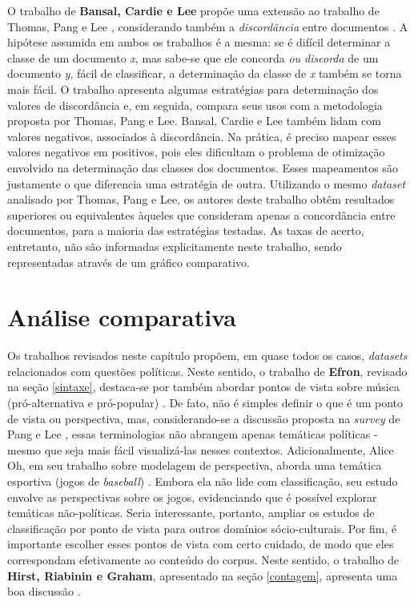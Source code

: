 O trabalho de \textbf{Bansal, Cardie e Lee} propõe uma extensão ao trabalho de Thomas, Pang e Lee \cite{get-out-the-vote}, considerando também a \emph{discordância} entre documentos \cite{disagree}. A hipótese assumida em ambos os trabalhos é a mesma: se é difícil determinar a classe de um documento \emph{x}, mas sabe-se que ele concorda \emph{ou discorda} de um documento \emph{y}, fácil de classificar, a determinação da classe de \emph{x} também se torna mais fácil. O trabalho apresenta algumas estratégias para determinação dos valores de discordância e, em seguida, compara seus usos com a metodologia proposta por Thomas, Pang e Lee. Bansal, Cardie e Lee também lidam com valores negativos, associados à discordância. Na prática, é preciso mapear esses valores negativos em positivos, pois eles dificultam o problema de otimização envolvido na determinação das classes dos documentos. Esses mapeamentos são justamente o que diferencia uma estratégia de outra. Utilizando o mesmo \emph{dataset} analisado por Thomas, Pang e Lee, os autores deste trabalho obtêm resultados superiores ou equivalentes àqueles que consideram apenas a concordância entre documentos, para a maioria das estratégias testadas. As taxas de acerto, entretanto, não são informadas explicitamente neste trabalho, sendo representadas através de um gráfico comparativo.



\section{Análise comparativa}
\label{compara}

Os trabalhos revisados neste capítulo propõem, em quase todos os casos, \emph{datasets} relacionados com questões políticas. Neste sentido, o trabalho de \textbf{Efron}, revisado na seção \ref{sintaxe}, destaca-se por também abordar pontos de vista sobre música (pró-alternativa e pró-popular) \cite{efron}. De fato, não é simples definir o que é um ponto de vista ou perspectiva, mas, considerando-se a discussão proposta na \emph{survey} de Pang e Lee \cite{omsa}, essas terminologias não abrangem apenas temáticas políticas - mesmo que seja mais fácil visualizá-las nesses contextos. Adicionalmente, Alice Oh, em seu trabalho sobre modelagem de perspectiva, aborda uma temática esportiva (jogos de \emph{baseball}) \cite{alice-oh}. Embora ela não lide com classificação, seu estudo envolve as perspectivas sobre os jogos, evidenciando que é possível explorar temáticas não-políticas. Seria interessante, portanto, ampliar os estudos de classificação por ponto de vista para outros domínios sócio-culturais. Por fim, é importante escolher esses pontos de vista com certo cuidado, de modo que eles correspondam efetivamente ao conteúdo do corpus. Neste sentido, o trabalho de \textbf{Hirst, Riabinin e Graham}, apresentado na seção \ref{contagem}, apresenta uma boa discussão \cite{hirst-et-al}. 

